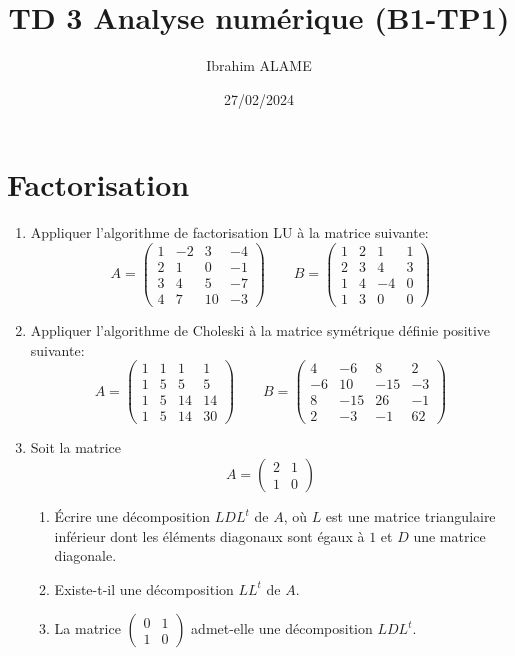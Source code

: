 \documentclass[a4paper]{article}
\title{TD 3 Analyse numérique (B1-TP1)}
\author{Ibrahim ALAME}
\date{27/02/2024}
\begin{document}
\maketitle

\section{Factorisation}
\begin{enumerate}
\item Appliquer l'algorithme de factorisation LU à la matrice suivante:
\[
A=\left(\begin{array}{cccc}
1&-2&3&-4\\
2&1&0&-1\\
3&4&5&-7\\
4&7&10&-3
\end{array}\right) \qquad
B=\left(\begin{array}{cccc}
1& 2& 1& 1\\
2& 3& 4& 3\\
1& 4& -4& 0\\
1& 3& 0& 0
\end{array}\right)
\]
\item Appliquer l'algorithme de Choleski à la matrice symétrique définie positive suivante:
\[
A=\left(\begin{array}{cccc}
1&1&1&1\\
1&5&5&5\\
1&5&14&14\\
1&5&14&30
\end{array}\right)\qquad
B=\left(\begin{array}{cccc}
4& -6& 8& 2\\
-6& 10& -15& -3\\
8& -15& 26& -1\\
2& -3& -1& 62
\end{array}\right)
\]
\item Soit la matrice 
\[A=\left(\begin{array}{cc}
2&1\\
1&0
\end{array}\right)
\]
\begin{enumerate}
\item Écrire une décomposition $LDL^t$ de $A$, où $L$ est une matrice triangulaire inférieur dont les éléments diagonaux sont égaux à $1$ et $D$ une matrice diagonale.
\item Existe-t-il une décomposition $LL^t$ de $A$.
\item La matrice $\left(\begin{array}{cc}
0&1\\
1&0
\end{array}\right)$ admet-elle une décomposition $LDL^t$.
\end{enumerate}


\end{enumerate}
\end{document}
